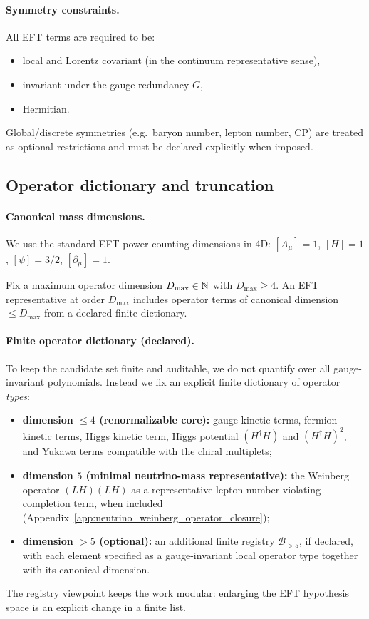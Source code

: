 \paragraph{Symmetry constraints.}
All EFT terms are required to be:
\begin{itemize}
\item local and Lorentz covariant (in the continuum representative sense),
\item invariant under the gauge redundancy $G$,
\item Hermitian.
\end{itemize}
Global/discrete symmetries (e.g.\ baryon number, lepton number, CP) are treated as optional restrictions and must be declared explicitly when imposed.

\subsection{Operator dictionary and truncation}

\paragraph{Canonical mass dimensions.}
We use the standard EFT power-counting dimensions in 4D:
$[A_\mu]=1$, $[H]=1$, $[\psi]=3/2$, $[\partial_\mu]=1$.

\begin{definition}\label{def:eft_truncation_order}
\MathTag Fix a maximum operator dimension $D_{\max}\in\mathbb{N}$ with $D_{\max}\ge 4$.
An EFT representative at order $D_{\max}$ includes operator terms of canonical dimension $\le D_{\max}$ from a declared finite dictionary.
\end{definition}

\paragraph{Finite operator dictionary (declared).}
To keep the candidate set finite and auditable, we do not quantify over all gauge-invariant polynomials.
Instead we fix an explicit finite dictionary of operator \emph{types}:
\begin{itemize}
\item \textbf{dimension $\le 4$ (renormalizable core):}
gauge kinetic terms, fermion kinetic terms, Higgs kinetic term, Higgs potential $(H^\dagger H)$ and $(H^\dagger H)^2$, and Yukawa terms compatible with the chiral multiplets;
\item \textbf{dimension $5$ (minimal neutrino-mass representative):}
the Weinberg operator $(L H)(L H)$ as a representative lepton-number-violating completion term, when included (Appendix~\ref{app:neutrino_weinberg_operator_closure});
\item \textbf{dimension $>5$ (optional):}
an additional finite registry $\mathcal{B}_{>5}$, if declared, with each element specified as a gauge-invariant local operator type together with its canonical dimension.
\end{itemize}
The registry viewpoint keeps the work modular: enlarging the EFT hypothesis space is an explicit change in a finite list.

